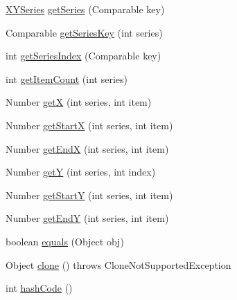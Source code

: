 \begin{DoxyCompactItemize}
\item 
\mbox{\hyperlink{classorg_1_1jfree_1_1data_1_1xy_1_1_x_y_series}{X\+Y\+Series}} \mbox{\hyperlink{classorg_1_1jfree_1_1data_1_1xy_1_1_x_y_series_collection_a8373546784da0578c0081c4c96a4225a}{get\+Series}} (Comparable key)
\item 
Comparable \mbox{\hyperlink{classorg_1_1jfree_1_1data_1_1xy_1_1_x_y_series_collection_a187f5a716fa918fcbfaa314b98aa9977}{get\+Series\+Key}} (int series)
\item 
int \mbox{\hyperlink{classorg_1_1jfree_1_1data_1_1xy_1_1_x_y_series_collection_a5f6800bb62c798125089dc749e29dc07}{get\+Series\+Index}} (Comparable key)
\item 
int \mbox{\hyperlink{classorg_1_1jfree_1_1data_1_1xy_1_1_x_y_series_collection_a9f06d873e55cdcefa42ccaa049dc8a1a}{get\+Item\+Count}} (int series)
\item 
Number \mbox{\hyperlink{classorg_1_1jfree_1_1data_1_1xy_1_1_x_y_series_collection_ad5ddad3a50f77de286608767e874e396}{getX}} (int series, int item)
\item 
Number \mbox{\hyperlink{classorg_1_1jfree_1_1data_1_1xy_1_1_x_y_series_collection_a6dc884bc2770f807b86b560a025f708b}{get\+StartX}} (int series, int item)
\item 
Number \mbox{\hyperlink{classorg_1_1jfree_1_1data_1_1xy_1_1_x_y_series_collection_a3a34b01823ad4f798a5f65e23096d1b5}{get\+EndX}} (int series, int item)
\item 
Number \mbox{\hyperlink{classorg_1_1jfree_1_1data_1_1xy_1_1_x_y_series_collection_aaafd64893e0c908c3f7c3f9ffc8d9bc9}{getY}} (int series, int index)
\item 
Number \mbox{\hyperlink{classorg_1_1jfree_1_1data_1_1xy_1_1_x_y_series_collection_acfaf042a69d421089ae292ec591e7799}{get\+StartY}} (int series, int item)
\item 
Number \mbox{\hyperlink{classorg_1_1jfree_1_1data_1_1xy_1_1_x_y_series_collection_a4c7808581b7aa99391293de0a7cb0cc4}{get\+EndY}} (int series, int item)
\item 
boolean \mbox{\hyperlink{classorg_1_1jfree_1_1data_1_1xy_1_1_x_y_series_collection_aff09e729e65fedc84d57150d5f6393d3}{equals}} (Object obj)
\item 
Object \mbox{\hyperlink{classorg_1_1jfree_1_1data_1_1xy_1_1_x_y_series_collection_af089a7b0389a175532d2128ebc4e0ae8}{clone}} ()  throws Clone\+Not\+Supported\+Exception 
\item 
int \mbox{\hyperlink{classorg_1_1jfree_1_1data_1_1xy_1_1_x_y_series_collection_aa126bb4ff528ab93b2bd1439ed955869}{hash\+Code}} ()

\end{DoxyCompactItemize}
